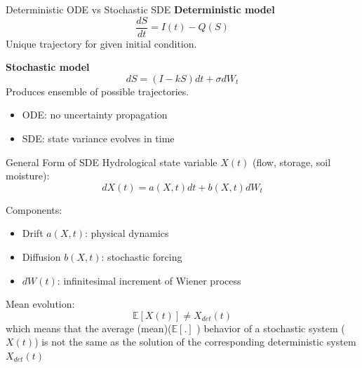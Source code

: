 \documentclass[8pt]{beamer}
\begin{document}





\begin{frame}{Deterministic ODE vs Stochastic SDE}
\textbf{Deterministic model}
\[
\frac{dS}{dt} = I(t) - Q(S)
\]
Unique trajectory for given initial condition.

\vspace{0.3cm}
\textbf{Stochastic model}
\[
dS = (I - kS)dt + \sigma dW_t
\]
Produces ensemble of possible trajectories.

\begin{itemize}
 \item ODE: no uncertainty propagation
 \item SDE: state variance evolves in time
\end{itemize}
\end{frame}

\begin{frame}{General Form of SDE}
Hydrological state variable $X(t)$ (flow, storage, soil moisture):
\[
dX(t) = a(X,t)dt + b(X,t)dW_t
\]

Components:
\begin{itemize}
 \item Drift $a(X,t)$: physical dynamics
 \item Diffusion $b(X,t)$: stochastic forcing
\item $dW(t)$: infinitesimal increment of Wiener process
\end{itemize}

Mean evolution:
\[
\mathbb{E}[X(t)] \neq X_{det}(t)
\]
which means that the average (mean)($\mathbb{E}[.]$ ) behavior of a stochastic system ($X(t)$) is not the same as the solution of the corresponding deterministic system $X_{det}(t)$

\end{frame}
\end{document}
